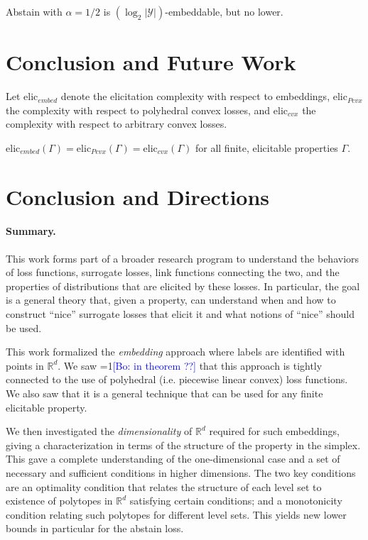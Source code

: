 \documentclass[11pt]{colt2019}
\newcommand{\Comments}{1}
\newcommand{\mynote}[2]{\ifnum\Comments=1\textcolor{#1}{#2}\fi}
\newcommand{\bo}[1]{\mynote{blue}{[Bo: #1]}}
\newcommand{\reals}{\mathbb{R}}
\newcommand{\Y}{\mathcal{Y}}
\begin{document}
\begin{conjecture}
  Abstain with $\alpha=1/2$ is $(\log_2 |\Y|)$-embeddable, but no lower.
\end{conjecture}

\section{Conclusion and Future Work}

Let $\mathrm{elic}_{embed}$ denote the elicitation complexity with respect to embeddings, $\mathrm{elic}_{Pcvx}$ the complexity with respect to polyhedral convex losses, and $\mathrm{elic}_{cvx}$ the complexity with respect to arbitrary convex losses.

\begin{conjecture}
  $\mathrm{elic}_{embed}(\Gamma) = \mathrm{elic}_{Pcvx}(\Gamma) = \mathrm{elic}_{cvx}(\Gamma)$ for all finite, elicitable properties $\Gamma$.
\end{conjecture}


\section{Conclusion and Directions}  \label{sec:conclusion}
\paragraph{Summary.}
This work forms part of a broader research program to understand the behaviors of loss functions, surrogate losses, link functions connecting the two, and the properties of distributions that are elicited by these losses.
In particular, the goal is a general theory that, given a property, can understand when and how to construct ``nice'' surrogate losses that elicit it and what notions of ``nice'' should be used.

This work formalized the \emph{embedding} approach where labels are identified with points in $\reals^d$.
We saw \bo{in theorem ??} that this approach is tightly connected to the use of polyhedral (i.e. piecewise linear convex) loss functions.
We also saw that it is a general technique that can be used for any finite elicitable property.

We then investigated the \emph{dimensionality} of $\reals^d$ required for such embeddings, giving a characterization in terms of the structure of the property in the simplex.
This gave a complete understanding of the one-dimensional case and a set of necessary and sufficient conditions in higher dimensions.
The two key conditions are an optimality condition that relates the structure of each level set to existence of polytopes in $\reals^d$ satisfying certain conditions; and a monotonicity condition relating such polytopes for different level sets.
This yields new lower bounds in particular for the abstain loss.
\end{document}
